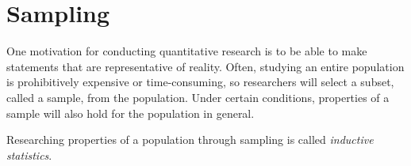 \chapter{Sampling}

One motivation for conducting quantitative research is to be able to make statements that are representative of reality. Often, studying an entire population is prohibitively expensive or time-consuming, so researchers will select a subset, called a sample, from the population. Under certain conditions, properties of a sample will also hold for the population in general.

\begin{definition}
  Researching properties of a population through sampling is called \emph{inductive statistics}.
\end{definition}

